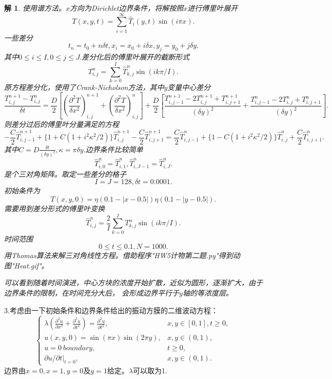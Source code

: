 \documentclass[10pt]{ctexart}
\newtheorem*{solution}{解}
\begin{document}
\begin{solution}
    使用谱方法。$x$方向为Dirichlet边界条件，将解按照$x$进行傅里叶展开
    $$T(x,y,t)=\sum\limits_{i=1}^{\infty}\hat{T}_{i}(y,t)\sin{(i\pi x)}.$$
    一些差分
    $$t_n=t_0+n\delta t,x_i=x_0+i\delta x,y_j=y_0+j\delta y.$$
    其中$0\leq i\leq I,0\leq j \leq J.$差分化后的傅里叶展开的截断形式
    $$T_{i,j}^{n}=\sum\limits_{k=0}^{I}\hat{T}_{k,j}^{n}\sin{(ik\pi/I)}.$$
    原方程差分化，使用了Crank-Nicholson方法，其中$y$变量中心差分
    $$\frac{T_{i,j}^{n+1}-T_{i,j}^{n}}{\delta t}=\frac{D}{2}\left[\left(\frac{\partial^2T}{\delta x^2}\right)_{i,j}^{n+1}+\left(\frac{\partial^2T}{\delta x^2}\right)_{i,j}^{n}\right]+\frac{D}{2}\left[\frac{T_{i,j-1}^{n+1}-2T_{i,j}^{n+1}+T_{i,j+1}^{n+1}}{(\delta y)^2}+\frac{T_{i,j-1}^{n}-2T_{i,j}^{n}+T_{i,j+1}^{n}}{(\delta y)^2}\right].$$
    则差分过后的傅里叶分量满足的方程
    $$-\frac{C}{2}\hat{T}_{i,j-1}^{n+1}+\{1+C(1+i^2\kappa^2/2)\}\hat{T}_{i,j}^{n+1}-\frac{C}{2}\hat{T}_{i,j+1}^{n+1}=\frac{C}{2}\hat{T}_{i,j-1}^{n}+\{1-C(1+i^2\kappa^2/2)\}\hat{T}_{i,j}^{n}+\frac{C}{2}\hat{T}_{i,j+1}^{n}.$$
    其中$C=D\frac{\delta t}{(\delta y)^2},\kappa=\pi\delta y.$边界条件比较简单
    $$\hat{T}_{i,0}^{n}=\hat{T}_{i,1}^{n},\hat{T}_{i,J-1}^{n}=\hat{T}_{i,J}^{n}.$$
    是个三对角矩阵。取定一些差分的格子
    $$I=J=128,\delta t=0.0001.$$
    初始条件为
    $$T(x,y,0)=\eta(0.1-|x-0.5|)\eta(0.1-|y-0.5|).$$
    需要用到差分形式的傅里叶变换
    $$\hat{T}_{i,j}^{n}=\frac{2}{I}\sum\limits_{k=0}^{I}T_{k,j}^{n}\sin{(ik\pi/I).}$$
    时间范围
    $$0\leq t \leq 0.1,N=1000.$$
    用Thomas算法来解三对角线性方程。借助程序"HW5计物第二题.py"得到动图"Heat.gif"。

    可以看到随着时间演进，中心方块的浓度开始扩散，近似为圆形，逐渐扩大，由于边界条件的限制，在时间充分大后，
    会形成边界平行于$y$轴的等浓度层。
\end{solution}
3.考虑由一下初始条件和边界条件给出的振动方膜的二维波动方程：
$$
\begin{cases}
    \lambda\left(\frac{\partial^2 u}{\partial x^2}+\frac{\partial^2 u}{\partial t^2}\right)=\frac{\partial^2 u}{\partial t^2}, & x,y\in[0,1],t\geq 0,\\
    u(x,y,0)=\sin{(\pi x)}\sin{(2\pi y)}, & x,y\in{(0,1)},\\
    u=0\ boundary, & t\geq 0,\\
    {\partial u}/{\partial t}|_{t=0}, & x,y\in(0,1).
\end{cases}$$
边界由$x=0,x=1,y=0$及$y=1$给定。$\lambda$可以取为1.
\end{document}
